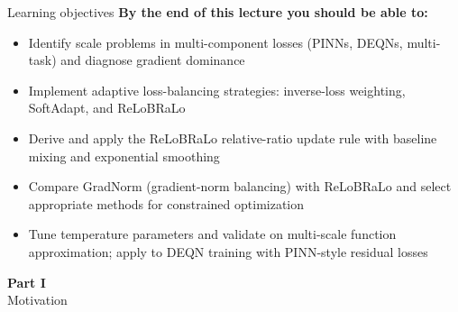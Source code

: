 \documentclass[aspectratio=169,11pt]{beamer}
\begin{document}
\begin{frame}{Learning objectives}
\textbf{By the end of this lecture you should be able to:}
\begin{itemize}
  \item Identify scale problems in multi-component losses (PINNs, DEQNs, multi-task) and diagnose gradient dominance
  \item Implement adaptive loss-balancing strategies: inverse-loss weighting, SoftAdapt, and ReLoBRaLo
  \item Derive and apply the ReLoBRaLo relative-ratio update rule with baseline mixing and exponential smoothing
  \item Compare GradNorm (gradient-norm balancing) with ReLoBRaLo and select appropriate methods for constrained optimization
  \item Tune temperature parameters and validate on multi-scale function approximation; apply to DEQN training with PINN-style residual losses
\end{itemize}
\end{frame}



\begin{frame}[plain,c]
\begin{center}
{\Huge \textcolor{uzhblue}{\textbf{Part I}}}\\[12pt]
{\LARGE Motivation}
\end{center}
\end{frame}
\end{document}

